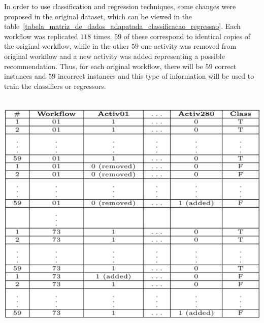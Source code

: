 \documentclass[40pt, a0, portrait]{a0poster}
\begin{document}
\begin{multicols}{2}
In order to use classification and regression techniques, some changes were proposed in the original dataset, which can be viewed in the table~\ref{tabela_matriz_de_dados_adapatada_classificacao_regressao}. Each workflow was replicated \(118\) times. \(59\) of these correspond to identical copies of the original workflow, while in the other \(59\) one activity was removed from original workflow and a new activity was added representing a possible recommendation. Thus, for each original workflow, there will be \(59\) correct instances and \(59\) incorrect instances and this type of information will be used to train the classifiers or regressors.

\begin{center}\vspace{1cm}
\includegraphics[height=12cm, width=28cm]{matrizAdaptada.png}
\label{tabela_matriz_de_dados_adapatada_classificacao_regressao}
\end{center}\vspace{1cm}



\end{multicols}
\end{document}
